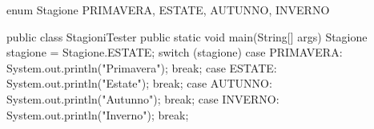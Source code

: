 \begin{unipdcode}[language=Java]
enum Stagione {
    PRIMAVERA, ESTATE, AUTUNNO, INVERNO
}

public class StagioniTester {
    public static void main(String[] args) {
        Stagione stagione = Stagione.ESTATE;
        switch (stagione) {
            case PRIMAVERA:
                System.out.println("Primavera");
                break;
            case ESTATE:
                System.out.println("Estate");
                break;
            case AUTUNNO:
                System.out.println("Autunno");
                break;
            case INVERNO:
                System.out.println("Inverno");
                break;
        }
    }
}
\end{unipdcode}
